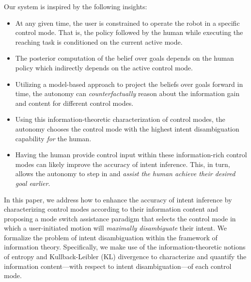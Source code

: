 \documentclass[letterpaper, 10 pt, conference]{ieeeconf}  %
\begin{document}
Our system is inspired by the following insights:
\begin{itemize}
	\item At any given time, the user is constrained to operate the robot in a specific control mode. That is, the policy followed by the human while executing the reaching task is conditioned on the current active mode. 
	\item The posterior computation of the belief over goals depends on the human policy which indirectly depends on the active control mode. 
	\item Utilizing a model-based approach to project the beliefs over goals forward in time, the autonomy can \textit{counterfactually } reason about the information gain and content for different control modes. 
	\item Using this information-theoretic characterization of control modes, the autonomy chooses the control mode with the highest intent disambiguation capability \textit{for} the human.
	\item Having the human provide control input within these information-rich control modes can likely improve the accuracy of intent inference. This, in turn, allows the autonomy to step in and \textit{assist the human achieve their desired goal earlier}. 
\end{itemize}


In this paper, we address how to enhance the accuracy of intent inference by characterizing control modes according to their information content and proposing a mode switch assistance paradigm that selects the control mode in which a user-initiated motion will \textit{maximally disambiguate} their intent. We formalize the problem of intent disambiguation within the framework of information theory. Specifically, we make use of the information-theoretic notions of entropy and Kullback-Leibler (KL) divergence to characterize and quantify the information content---with respect to intent disambiguation---of each control mode. 
\end{document}

